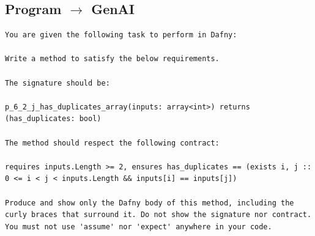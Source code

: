\documentclass{article}
\begin{document}
\subsection*{Program $\rightarrow$ GenAI}
\begin{lstlisting}
You are given the following task to perform in Dafny:

Write a method to satisfy the below requirements.

The signature should be:

p_6_2_j_has_duplicates_array(inputs: array<int>) returns (has_duplicates: bool)

The method should respect the following contract:

requires inputs.Length >= 2, ensures has_duplicates == (exists i, j :: 0 <= i < j < inputs.Length && inputs[i] == inputs[j])

Produce and show only the Dafny body of this method, including the curly braces that surround it. Do not show the signature nor contract. You must not use 'assume' nor 'expect' anywhere in your code.
\end{lstlisting}
\end{document}

